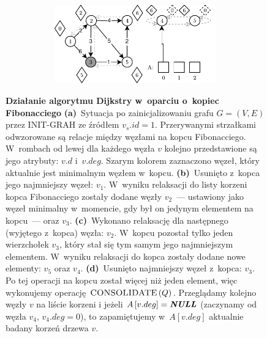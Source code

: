 \begin{figure}[!htbp]
\begin{subfigure}[b]{\textwidth}
\begin{subfigure}[b]{0.46\textwidth}
			\caption{}
			\label{fig:exampleFibonacci:c}
		\end{subfigure}
		\hfill
		\begin{subfigure}[b]{0.46\textwidth}
			\includegraphics[width=\textwidth]{Chapter_II/FIBONACCI-Example/d.pdf}
			\caption{}
			\label{fig:exampleFibonacci:d}
		\end{subfigure}
		\hfill\null
	\end{subfigure}
	\caption{
		\textbf{Działanie algorytmu Dijkstry w~oparciu o~kopiec Fibonacciego}
		\textbf{(a)}~Sytuacja po zainicjalizowaniu grafu $G = \left( V, E \right)$ przez \textsf{INIT-GRAH} ze źródłem $v_{s}.id = 1$.
		Przerywanymi strzałkami odwzorowane są relacje między węzłami na kopcu Fibonacciego.
		W~rombach od lewej dla każdego węzła $v$ kolejno przedstawione są jego atrybuty: $v.d$ i~$v.deg$.
		Szarym kolorem zaznaczono węzeł, który aktualnie jest minimalnym węzłem w~kopcu.
		\textbf{(b)}~Usunięto z~kopca jego najmniejszy węzeł: $v_{1}$.
		W~wyniku relaksacji do listy korzeni kopca Fibonacciego zostały dodane węzły $v_{2}$~--- ustawiony jako węzeł minimalny w~momencie, gdy był on jedynym elementem na kopcu~--- oraz $v_{3}$.
		\textbf{(c)}~Wykonano relaksację dla następnego (wyjętego z~kopca) węzła: $v_{2}$.
		W~kopcu pozostał tylko jeden wierzchołek $v_{3}$, który stał się tym samym jego najmniejszym elementem.
		W~wyniku relaksacji do kopca zostały dodane nowe elementy: $v_{5}$ oraz $v_{4}$.
		\textbf{(d)}~Usunięto najmniejszy węzeł z~kopca: $v_{3}$.
		Po tej operacji na kopcu został więcej niż jeden element, więc wykonujemy operację $\textrm{\textsc{CONSOLIDATE}} \left( Q \right)$.
		Przeglądamy kolejno węzły $v$ na liście korzeni i jeżeli $A \left[ v.deg \right] = \emph{\textbf{NULL}} $ (zaczynamy od węzła $v_{4}$, $v_{4}.deg = 0$), to zapamiętujemy w~$A \left[ v.deg \right]$ aktualnie badany korzeń drzewa $v$.
	}
	\label{fig:exampleFibonacciA}
\end{figure}

